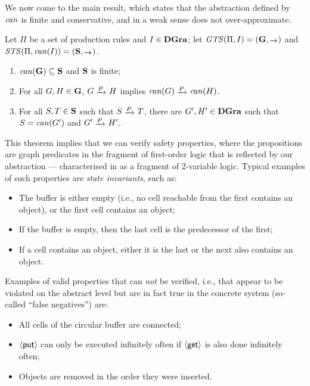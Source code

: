%
%
We now come to the main result, which states that the abstraction defined by
$\mathit{can}$ is finite and conservative, and in a weak sense does not over-approximate.
%
\begin{theorem}
Let $\Pi$ be a set of production rules and $I\in \mathbf{DGra}$; let
$\GTS(\Pi,I)=(\bG,{\trans~})$ and $\STS(\Pi, \GCanon(I))=(\bS,{\trans~})$.
\begin{enumerate}\noitemsep\smalltopsep
\item $\mathit{can}({\mathbf{G}}) \subseteq {\mathbf{S}}$ and ${\mathbf{S}}$ is finite;
\item For all $G,H\in {\mathbf{G}}$, $G\trans P H$ implies $\GCanon(G) \trans P
  \GCanon(H)$.
\item For all $S,T\in {\mathbf{S}}$ such that $S\trans{P} T$, there are $G',H'\in
  \mathbf{DGra}$ such that $S=\mathit{can}(G')$ and $G'\trans{P} H'$.
\end{enumerate}
\end{theorem}
%
This theorem implies that we can verify safety properties, where the
propositions are graph predicates in the fragment of first-order logic that is
reflected by our abstraction --- characterised in \cite{Rens04-esop} as a
fragment of 2-variable logic. Typical examples of such properties are
\emph{state invariants}, such as:
%
\begin{itemize}\noitemsep
\item The buffer is either empty (i.e., no cell reachable from the first
  contains an object), or the first cell contains an object;
\item If the buffer is empty, then the last cell is the predecessor of the first;
\item If a cell contains an object, either it is the last or the next also 
  contains an object.
\end{itemize}
%
Examples of valid properties that can \emph{not} be verified, i.e., that appear
to be violated on the abstract level but are in fact true in the concrete
system (so-called ``false negatives'') are:
%
\begin{itemize}\noitemsep
\item All cells of the circular buffer are connected;
\item ${{\langle \mathsf{put} \rangle}}$ can only be executed infinitely often if ${{\langle \mathsf{get} \rangle}}$ is also done
  infinitely often;
\item Objects are removed in the order they were inserted.
\end{itemize}

